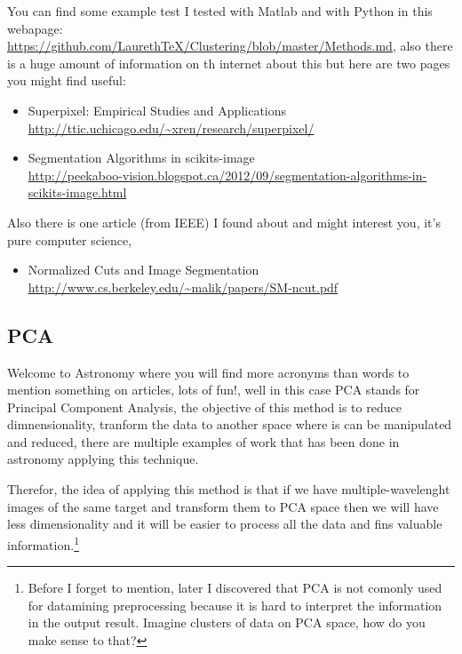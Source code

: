 \documentclass[11pt,fleqn]{book} %
\begin{document}
\begin{remark}
	You can find some example test I tested with Matlab and with Python in this webapage: \url{https://github.com/LaurethTeX/Clustering/blob/master/Methods.md}, also there is a huge amount of information on th internet about this but here are two pages you might find useful:
    \begin{itemize}
    	\item Superpixel: Empirical Studies and Applications \\ \url{http://ttic.uchicago.edu/~xren/research/superpixel/}
        \item Segmentation Algorithms in scikits-image \\ \url{http://peekaboo-vision.blogspot.ca/2012/09/segmentation-algorithms-in-scikits-image.html}
    \end{itemize}
    Also there is one article (from IEEE) I found about and might interest you, it's pure computer science,
    \begin{itemize}
    	\item Normalized Cuts and Image Segmentation \\ \url{http://www.cs.berkeley.edu/~malik/papers/SM-ncut.pdf}
    \end{itemize}
\end{remark}

\subsection{PCA}

Welcome to Astronomy where you will find more acronyms than words to mention something on articles, lots of fun!, well in this case PCA stands for Principal Component Analysis, the objective of this method is to reduce dimnensionality, tranform the data to another space where is can be manipulated and reduced, there are multiple examples of work that has been done in astronomy applying this technique.

Therefor, the idea of applying this method is that if we have multiple-wavelenght images of the same target and transform them to PCA space then we will have less dimensionality and it will be easier to process all the data and fins valuable information.\footnote{Before I forget to mention, later I discovered that PCA is not comonly used for datamining preprocessing because it is hard to interpret the information in the output result. Imagine clusters of data on PCA space, how do you make sense to that?}
\end{document}
